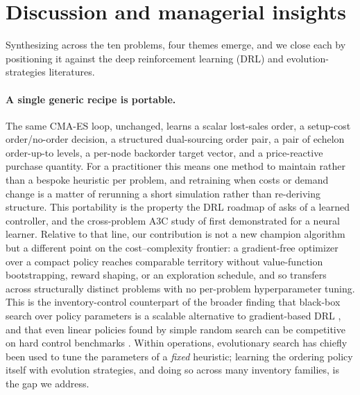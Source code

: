 \section{Discussion and managerial insights}
\label{sec:discussion}

Synthesizing across the ten problems, four themes emerge, and we close each by positioning it against
the deep reinforcement learning (DRL) and evolution-strategies literatures.

\paragraph{A single generic recipe is portable.}
The same CMA-ES loop, unchanged, learns a scalar lost-sales order, a setup-cost order/no-order
decision, a structured dual-sourcing order pair, a pair of echelon order-up-to levels, a per-node
backorder target vector, and a price-reactive purchase quantity. For a practitioner this means one
method to maintain rather than a bespoke heuristic per problem, and retraining when costs or demand
change is a matter of rerunning a short simulation rather than re-deriving structure. This portability
is the property the DRL roadmap of \citet{boute2022deep} asks of a learned controller, and the
cross-problem A3C study of \citet{gijsbrechts2022drl} first demonstrated for a neural learner.
Relative to that line, our contribution is not a new champion algorithm but a different point on the
cost--complexity frontier: a gradient-free optimizer over a compact policy reaches comparable territory
without value-function bootstrapping, reward shaping, or an exploration schedule, and so transfers
across structurally distinct problems with no per-problem hyperparameter tuning. This is the
inventory-control counterpart of the broader finding that black-box search over policy parameters is a
scalable alternative to gradient-based DRL \citep{Salimans2017EvolutionLearning}, and that even
linear policies found by simple random search can be competitive on hard control benchmarks
\citep{mania2018ars}. Within operations, evolutionary search has chiefly been used to tune the
parameters of a \emph{fixed} heuristic; learning the ordering policy itself with evolution strategies,
and doing so across many inventory families, is the gap we address.

